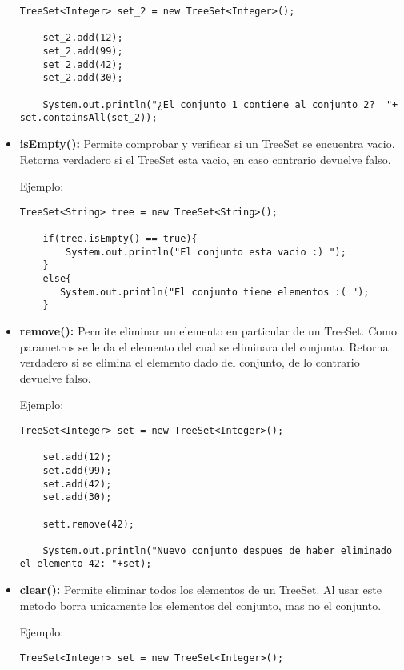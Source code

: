 \documentclass[12pt, letterpaper]{article} %
\begin{document}
\begin{itemize}
\begin{lstlisting}[frame=single]
    TreeSet<Integer> set_2 = new TreeSet<Integer>();

    set_2.add(12);
    set_2.add(99);
    set_2.add(42);
    set_2.add(30);

    System.out.println("¿El conjunto 1 contiene al conjunto 2?  "+ set.containsAll(set_2));
    \end{lstlisting}

    \item \textbf{isEmpty():} Permite comprobar y verificar si un TreeSet se encuentra vacio. Retorna verdadero si el TreeSet esta vacio, en caso contrario devuelve falso.
    
    Ejemplo:
    \lstset{language = Java, breaklines=true, basicstyle=\footnotesize}
    \begin{lstlisting}[frame=single]
    TreeSet<String> tree = new TreeSet<String>();

    if(tree.isEmpty() == true){
        System.out.println("El conjunto esta vacio :) ");
    }
    else{
	   System.out.println("El conjunto tiene elementos :( ");
    }
    \end{lstlisting}

    \item \textbf{remove():} Permite eliminar un elemento en particular de un TreeSet. Como parametros se le da el elemento del cual se eliminara del conjunto. Retorna verdadero si se elimina el elemento dado del conjunto, de lo contrario devuelve falso.
    
    Ejemplo:
    \lstset{language = Java, breaklines=true, basicstyle=\footnotesize}
    \begin{lstlisting}[frame=single]
    TreeSet<Integer> set = new TreeSet<Integer>();

    set.add(12);
    set.add(99);
    set.add(42);
    set.add(30);

    sett.remove(42);

    System.out.println("Nuevo conjunto despues de haber eliminado el elemento 42: "+set);
    \end{lstlisting}

    \item \textbf{clear():} Permite eliminar todos los elementos de un TreeSet. Al usar este metodo borra unicamente los elementos del conjunto, mas no el conjunto.

    Ejemplo:
    \lstset{language = Java, breaklines=true, basicstyle=\footnotesize}
    \begin{lstlisting}[frame=single]
    TreeSet<Integer> set = new TreeSet<Integer>();


\end{lstlisting}
\end{itemize}
\end{document}
